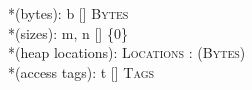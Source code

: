 \begin{plstx}
*(bytes): b [\in] \textsc{Bytes}\\
*(sizes): m, n [\in]  \cup \{0\}\\
*(heap locations): \ell [\in] \textsc{Locations} : (\textsc{Bytes})\\
*(access tags): t [\in] \textsc{Tags}\\
\end{plstx}